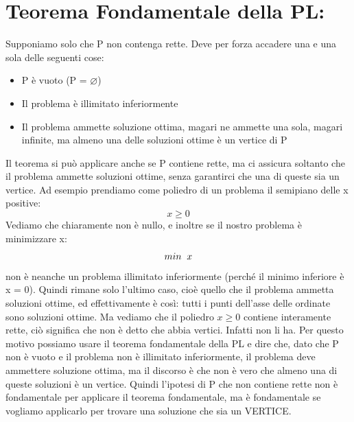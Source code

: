 \section{Teorema Fondamentale della PL:}
Supponiamo solo che P non contenga rette. Deve per forza accadere una e una sola delle seguenti cose:
\begin{itemize}
    \item P è vuoto (P = $\varnothing$)
    \item Il problema è illimitato inferiormente
    \item Il problema ammette soluzione ottima, magari ne ammette una sola, magari infinite, ma almeno una delle soluzioni ottime è un vertice di P
\end{itemize}
Il teorema si può applicare anche se P contiene rette, ma ci assicura soltanto che il problema ammette soluzioni ottime, senza garantirci che una di queste sia un vertice. Ad esempio prendiamo come poliedro di un problema il semipiano delle x positive:
\begin{equation*}
    x \geq 0
\end{equation*}
Vediamo che chiaramente non è nullo, e inoltre se il nostro problema è minimizzare x:
\begin{equation*}
    min \hspace{0.2cm} x
\end{equation*}
non è neanche un problema illimitato inferiormente (perché il minimo inferiore è x = 0). Quindi rimane solo l'ultimo caso, cioè quello che il problema ammetta soluzioni ottime, ed effettivamente è così: tutti i punti dell'asse delle ordinate sono soluzioni ottime. Ma vediamo che il poliedro $x \geq 0$ contiene interamente rette, ciò significa che non è detto che abbia vertici. Infatti non li ha. Per questo motivo possiamo usare il teorema fondamentale della PL e dire che, dato che P non è vuoto e il problema non è illimitato inferiormente, il problema deve ammettere soluzione ottima, ma il discorso è che non è vero che almeno una di queste soluzioni è un vertice. Quindi l'ipotesi di P che non contiene rette non è fondamentale per applicare il teorema fondamentale, ma è fondamentale se vogliamo applicarlo per trovare una soluzione che sia un VERTICE.

